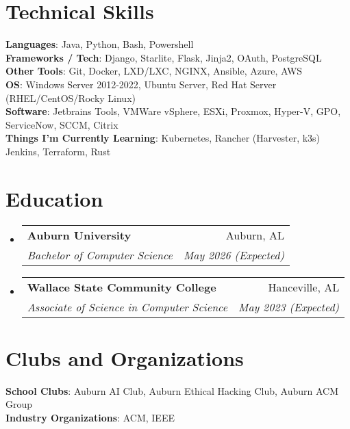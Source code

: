 \documentclass[letterpaper,11pt]{article}
\makeatletter
\newcommand{\resumeSubheading}[4]{
  \vspace{-2pt}\item
    \begin{tabular*}{0.97\textwidth}[t]{l@{\extracolsep{\fill}}r}
      \textbf{#1} & #2 \\
      \textit{\small#3} & \textit{\small #4} \\
    \end{tabular*}\vspace{-7pt}
}
\newcommand{\resumeSubHeadingListStart}{\begin{itemize}[leftmargin=0.15in, label={}]}
\newcommand{\resumeSubHeadingListEnd}{\end{itemize}}
\makeatother
\begin{document}
\section{Technical Skills}
 \begin{itemize}[leftmargin=0.15in, label={}]
    \small{\item{
     \textbf{Languages}{: Java, Python, Bash, Powershell} \\
     \textbf{Frameworks / Tech}{: Django, Starlite, Flask, Jinja2, OAuth, PostgreSQL} \\
     \textbf{Other Tools}{: Git, Docker, LXD/LXC, NGINX, Ansible, Azure, AWS} \\
     \textbf{OS}{: Windows Server 2012-2022, Ubuntu Server, Red Hat Server (RHEL/CentOS/Rocky Linux)} \\
     \textbf{Software}{: Jetbrains Tools, VMWare vSphere, ESXi, Proxmox, Hyper-V, GPO, ServiceNow, SCCM, Citrix} \\
     \textbf{Things I'm Currently Learning}{: Kubernetes, Rancher (Harvester, k3s) Jenkins, Terraform, Rust}
    }}
 \end{itemize}

\section{Education}
  \resumeSubHeadingListStart
  \resumeSubheading
      {Auburn University} {Auburn, AL}
      {Bachelor of Computer Science}{May 2026 (Expected)}
    \resumeSubheading
      {Wallace State Community College} {Hanceville, AL}
      {Associate of Science in Computer Science}{May 2023 (Expected)}
  \resumeSubHeadingListEnd
  
\section{Clubs and Organizations}
 \begin{itemize}[leftmargin=0.15in, label={}]
    \small{\item{
     \textbf{School Clubs}{: Auburn AI Club, Auburn Ethical Hacking Club, Auburn ACM Group} \\
     \textbf{Industry Organizations}{: ACM, IEEE} \\
    }}
 \end{itemize}


\end{document}
